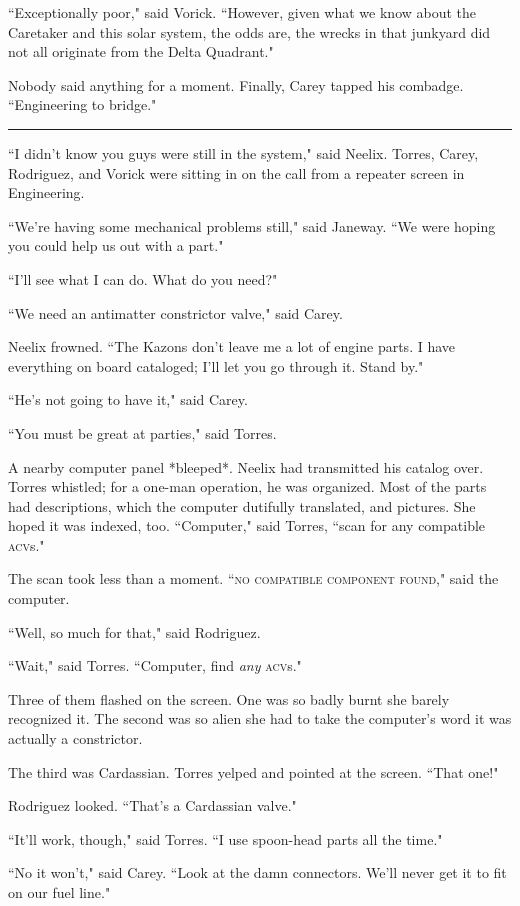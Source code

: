 \documentclass[twoside,letterpaper,12pt]{memoir}
\begin{document}
``Exceptionally poor," said Vorick. ``However, given what we know about the Caretaker and this solar system, the odds are, the wrecks in that junkyard did not all originate from the Delta Quadrant."

Nobody said anything for a moment. Finally, Carey tapped his combadge. ``Engineering to bridge."

\fancybreak{\rule{3cm}{0.4 pt}}
``I didn't know you guys were still in the system," said Neelix. Torres, Carey, Rodriguez, and Vorick were sitting in on the call from a repeater screen in Engineering.

``We're having some mechanical problems still," said Janeway. ``We were hoping you could help us out with a part."

``I'll see what I can do. What do you need?"

``We need an antimatter constrictor valve," said Carey.

Neelix frowned. ``The Kazons don't leave me a lot of engine parts. I have everything on board cataloged; I'll let you go through it. Stand by."

``He's not going to have it," said Carey.

``You must be great at parties," said Torres.

A nearby computer panel *bleeped*. Neelix had transmitted his catalog over. Torres whistled; for a one-man operation, he was organized. Most of the parts had descriptions, which the computer dutifully translated, and pictures. She hoped it was indexed, too. ``Computer," said Torres, ``scan for any compatible \textsc{acv}s."

The scan took less than a moment. ``\textsc{no compatible component found}," said the computer.

``Well, so much for that," said Rodriguez.

``Wait," said Torres. ``Computer, find \textit{any} \textsc{acv}s."

Three of them flashed on the screen. One was so badly burnt she barely recognized it. The second was so alien she had to take the computer's word it was actually a constrictor.

The third was Cardassian. Torres yelped and pointed at the screen. ``That one!"

Rodriguez looked. ``That's a Cardassian valve."

``It'll work, though," said Torres. ``I use spoon-head parts all the time."

``No it won't," said Carey. ``Look at the damn connectors. We'll never get it to fit on our fuel line."
\end{document}

